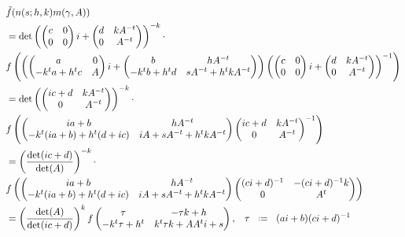 \begin{align*}
	&\tilde{f}(n(s; h, k) m(\gamma, A) ) \\
	 &= \det\left(\begin{pmatrix}
		c & 0 \\
		0 & 0
	\end{pmatrix}i+ \begin{pmatrix}
		d & kA^{-t} \\
		0 & A^{-t}
	\end{pmatrix} \right)^{-k} \cdot \\
	&f\left(         \left(\begin{pmatrix}
		a & 0\\
		-k^ta + h^tc & A
	\end{pmatrix}i+\begin{pmatrix}
		b & hA^{-t} \\
		-k^tb + h^td & sA^{-t} + h^tkA^{-t}
	\end{pmatrix}\right)   \left(\begin{pmatrix}
		c & 0 \\
		0 & 0
	\end{pmatrix}i+ \begin{pmatrix}
		d & kA^{-t} \\
		0 & A^{-t}
	\end{pmatrix} \right)\inv      \right) \\
	&= \det\left( \begin{pmatrix}
		ic + d & kA^{-t} \\
		0 & A^{-t}
	\end{pmatrix}\right)^{-k} \cdot \\
	&f\left( \begin{pmatrix}
		ia + b &  hA^{-t}\\
		-k^t(ia +b) + h^t(d + ic) & iA + sA^{-t} + h^tkA^{-t}
	\end{pmatrix}  \begin{pmatrix}
		ic + d & kA^{-t} \\
		0 & A^{-t}
	\end{pmatrix}\inv      \right) \\
	&=\left(\frac{\det(ic + d)}{\det(A)}\right)^{-k} \cdot \\ &f\left( \begin{pmatrix}
		ia + b &  hA^{-t}\\
		-k^t(ia +b) + h^t(d + ic) & iA + sA^{-t} + h^tkA^{-t}
	\end{pmatrix}   \begin{pmatrix}(ci+d)^{-1} & -(ci+d)^{-1} k\\ 0 & A^t \end{pmatrix} \right) \\
	&= \left(\frac{\det(A)}{\det(ic + d)}\right)^{k} f\begin{pmatrix} \tau & -\tau k + h\\ -k^t \tau + h^t & k^t \tau k + A A^t i + s \end{pmatrix}, \;\;\; \tau \defeq (ai+b)(ci + d)\inv \\
\end{align*} 
